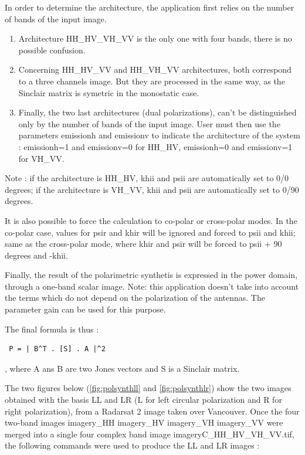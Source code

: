 In order to determine the architecture, the application first relies on the number of bands of the input image.
\begin{enumerate}
\item Architecture HH\_HV\_VH\_VV is the only one with four bands, there is no possible confusion.
\item Concerning HH\_HV\_VV and HH\_VH\_VV architectures, both correspond to a three channels image. But they are processed in the same way, as the Sinclair matrix is symetric in the monostatic case.
\item Finally, the two last architectures (dual polarizations), can't be distinguished only by the number of bands of the input image. User must then use the parameters emissionh and emissionv to indicate the architecture of the system : emissionh=1 and emissionv=0 for HH\_HV,  emissionh=0 and emissionv=1 for VH\_VV.
\end{enumerate}
Note : if the architecture is HH\_HV, khii and psii are automatically set to 0/0 degrees; if the architecture is VH\_VV, khii and psii are automatically set to 0/90 degrees.

It is also possible to force the calculation to co-polar or cross-polar modes.
In the co-polar case, values for psir and khir will be ignored and forced to psii and khii; same as the cross-polar mode, where khir and psir will be forced to psii + 90 degrees and -khii.

Finally, the result of the polarimetric synthetis is expressed in the power domain, through a one-band scalar image. \newline
Note: this application doesn't take into account the terms which do not depend on the polarization of the antennas. 
The parameter gain can be used for this purpose.

 
The final formula is thus : \begin{verbatim} P = | B^T . [S] . A |^2 \end{verbatim} , where A ans B are two Jones vectors and S is a Sinclair matrix.
 
The two figures below (\ref{fig:polsynthll} and \ref{fig:polsynthlr}) show the two images obtained with the basis LL and LR (L for left circular polarization and R for right polarization),
from a Radarsat 2 image taken over Vancouver. Once the four two-band images imagery\_HH imagery\_HV imagery\_VH imagery\_VV were merged 
into a single four complex band image imageryC\_HH\_HV\_VH\_VV.tif, the following commands were used to produce the LL and LR images :

